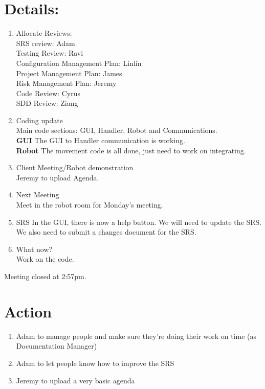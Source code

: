 \documentclass{article}
\begin{document}
\section{Details:}
\begin{enumerate}
\item Allocate Reviews:\\
SRS review: Adam\\
Testing Review: Ravi\\
Configuration Management Plan: Linlin\\
Project Management Plan: James\\
Risk Management Plan: Jeremy\\
Code Review: Cyrus\\
SDD Review: Ziang\\

\item Coding update\\
Main code sections: GUI, Handler, Robot and Communications.\\
\textbf{GUI} The GUI to Handler communication is working.\\
\textbf{Robot} The movement code is all done, just need to work on integrating.\\
\item Client Meeting/Robot demonstration\\
Jeremy to upload Agenda.\\
\item Next Meeting\\
Meet in the robot room for Monday's meeting.

\item SRS
In the GUI, there is now a help button. We will need to update the SRS. We also need to submit a changes document for the SRS.

\item What now?\\
Work on the code.

\end{enumerate}

Meeting closed at 2:57pm.

\section{Action}
\begin{enumerate}
\item Adam to manage people and make sure they're doing their work on time (as Documentation Manager)
\item Adam to let people know how to improve the SRS
\item Jeremy to upload a very basic agenda
\end{enumerate}
\end{document}
